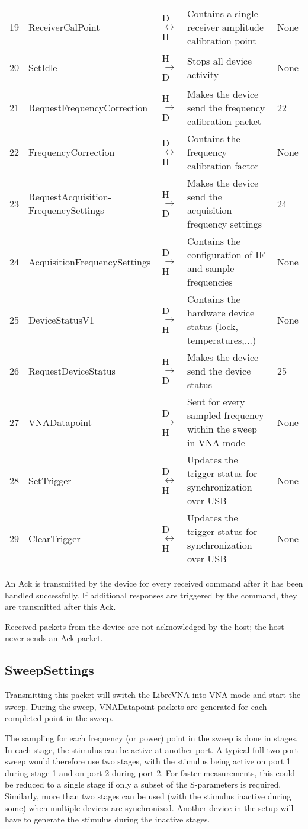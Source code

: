 \documentclass[a4paper,11pt]{article}
\begin{document}
\begin{ThreePartTable}
\begin{longtable}{p{} |  p{} | p{} | p{} |p{} }
19 & ReceiverCalPoint & D$\leftrightarrow$H & Contains a single receiver amplitude calibration point &None \\
20 & SetIdle & H$\rightarrow$D & Stops all device activity & None \\
21 & RequestFrequencyCorrection & H$\rightarrow$D & Makes the device send the frequency calibration packet &22 \\
22 & FrequencyCorrection & D$\leftrightarrow$H & Contains the frequency calibration factor & None\\
23 & RequestAcquisition-FrequencySettings & H$\rightarrow$D & Makes the device send the acquisition frequency settings & 24\\
24 & AcquisitionFrequencySettings & D$\rightarrow$H & Contains the configuration of IF and sample frequencies &None \\
25 & DeviceStatusV1 & D$\rightarrow$H & Contains the hardware device status (lock, temperatures,...) &None \\
26 & RequestDeviceStatus & H$\rightarrow$D & Makes the device send the device status &25 \\
27 & VNADatapoint & D$\rightarrow$H & Sent for every sampled frequency within the sweep in VNA mode &None \\
28 & SetTrigger & D$\leftrightarrow$H & Updates the trigger status for synchronization over USB & None\\
29 & ClearTrigger & D$\leftrightarrow$H & Updates the trigger status for synchronization over USB & None\\
\end{longtable}   
\end{ThreePartTable}
An Ack is transmitted by the device for every received command after it has been handled successfully. If additional responses are triggered by the command, they are transmitted after this Ack.

Received packets from the device are not acknowledged by the host; the host never sends an Ack packet.

\subsection{SweepSettings}
Transmitting this packet will switch the LibreVNA into VNA mode and start the sweep. During the sweep, VNADatapoint packets are generated for each completed point in the sweep.

The sampling for each frequency (or power) point in the sweep is done in stages. In each stage, the stimulus can be active at another port. A typical full two-port sweep would therefore use two stages, with the stimulus being active on port 1 during stage 1 and on port 2 during port 2. For faster measurements, this could be reduced to a single stage if only a subset of the S-parameters is required. Similarly, more than two stages can be used (with the stimulus inactive during some) when multiple devices are synchronized. Another device in the setup will have to generate the stimulus during the inactive stages.
\end{document}
